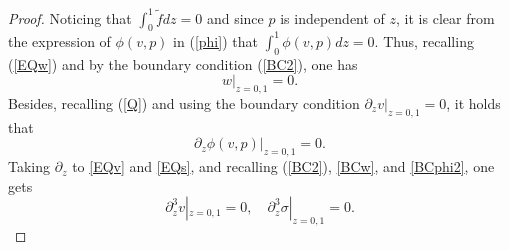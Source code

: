 \documentclass[10pt,a4paper]{amsart}
\begin{document}
\begin{proof}
Noticing that $\int_0^1\tilde fdz=0$ and since $p$ is independent of $z$, it is clear from the expression of $\phi(v,p)$ in (\ref{phi}) that
$\int_0^1\phi(v,p)dz=0.$
Thus, recalling (\ref{EQw}) and by the boundary condition (\ref{BC2}), one has
\begin{equation}
  \label{BCw}
  w|_{z=0,1}=0.
\end{equation}
Besides, recalling (\ref{Q}) and using the boundary condition $\partial_zv|_{z=0,1}=0$, it holds that
\begin{equation}
  \label{BCphi2}
  \partial_z\phi(v,p)|_{z=0,1}=0.
\end{equation}
Taking $\partial_z$ to \eqref{EQv} and \eqref{EQs}, and recalling (\ref{BC2}), \eqref{BCw}, and \eqref{BCphi2}, one gets
\begin{equation}
  \label{BC3}
  \partial_z^3v|_{z=0,1}=0,\quad\partial_z^3\sigma|_{z=0,1}=0.
\end{equation}


\end{proof}
\end{document}
